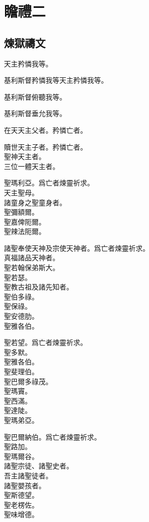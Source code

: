 \chapter[瞻禮二]{瞻禮二}
\section{煉獄禱文}
\versicle 天主矜憐我等。

\Response 基利斯督矜憐我等\hfill 天主矜憐我等。

\versicle 基利斯督俯聽我等。

\Response 基利斯督垂允我等。

\versicle 在天天主父者。\hfill \response 矜憐亡者。

\versicle 贖世天主子者。\hfill \response 矜憐亡者。\\
聖神天主者。\\
三位一體天主者。

\versicle 聖瑪利亞。\hfill \response 爲亡者煉靈祈求。\\
天主聖母。\\
諸童身之聖童身者。\\
聖彌額爾。\\
聖嘉俾阨爾。\\
聖辣法阨爾。

\versicle 諸聖奉使天神及宗使天神者。\hfill \response 爲亡者煉靈祈求。\\
真福諸品天神者。\\
聖若翰保弟斯大。\\
聖若瑟。\\
聖教古祖及諸先知者。\\
聖伯多祿。\\
聖保祿。\\
聖安德肋。\\
聖雅各伯。

\versicle 聖若望。\hfill \response 爲亡者煉靈祈求。\\
聖多默。\\
聖雅各伯。\\
聖斐理伯。\\
聖巴爾多祿茂。\\
聖瑪竇。\\
聖西滿。\\
聖達陡。\\
聖瑪弟亞。

\versicle 聖巴爾納伯。\hfill \response 爲亡者煉靈祈求。\\
聖路加。\\
聖瑪爾谷。\\
諸聖宗徒、諸聖史者。\\
吾主諸聖徒者。\\
諸聖嬰孩者。\\
聖斯德望。\\
聖老楞佐。\\
聖味增德。

